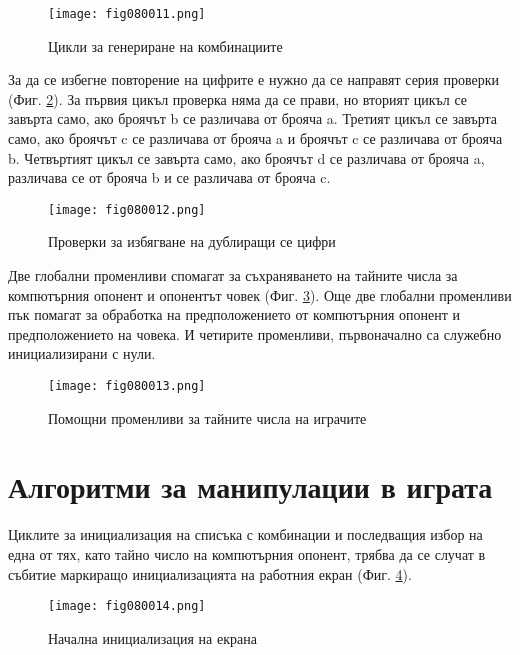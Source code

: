 \begin{figure}[H]
  \centering
  \texttt{[image: fig080011.png]}
  \caption{Цикли за генериране на комбинациите}
\label{fig080011}
\end{figure}

За да се избегне повторение на цифрите е нужно да се направят серия проверки (Фиг. \ref{fig080012}). За първия цикъл проверка няма да се прави, но вторият цикъл се завърта само, ако броячът b се различава от брояча a. Третият цикъл се завърта само, ако броячът c се различава от брояча a и броячът c се различава от брояча b. Четвъртият цикъл се завърта само, ако броячът d се различава от брояча a, различава се от брояча b и се различава от брояча c. 

\begin{figure}[H]
  \centering
  \texttt{[image: fig080012.png]}
  \caption{Проверки за избягване на дублиращи се цифри}
\label{fig080012}
\end{figure}

Две глобални променливи спомагат за съхраняването на тайните числа за компютърния опонент и опонентът човек (Фиг. \ref{fig080013}). Още две глобални променливи пък помагат за обработка на предположението от компютърния опонент и предположението на човека. И четирите променливи, първоначално са служебно инициализирани с нули.

\begin{figure}[H]
  \centering
  \texttt{[image: fig080013.png]}
  \caption{Помощни променливи за тайните числа на играчите}
\label{fig080013}
\end{figure}

\section{Алгоритми за манипулации в играта}

Циклите за инициализация на списъка с комбинации и последващия избор на една от тях, като тайно число на компютърния опонент, трябва да се случат в събитие маркиращо инициализацията на работния екран (Фиг. \ref{fig080014}).

\begin{figure}[H]
  \centering
  \texttt{[image: fig080014.png]}
  \caption{Начална инициализация на екрана}
\label{fig080014}
\end{figure}

